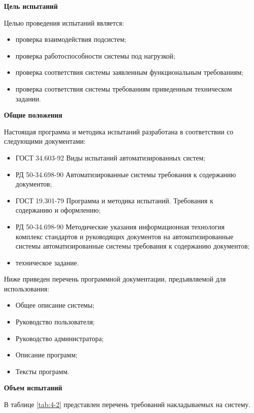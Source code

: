 \textbf{Цель испытаний}

Целью проведения испытаний является:
\begin{itemize}
  \item проверка взаимодействия подсистем;
  \item проверка работоспособности системы под
нагрузкой;
  \item проверка соответствия системы заявленным функциональным
требованиям;
  \item проверка соответствия системы требованиям приведенным техническом
задании.
\end{itemize}

\textbf{Общие положения}

Настоящая программа и методика испытаний разработана в соответствии со
следующими документами:
\begin{itemize}
  \item ГОСТ 34.603-92 Виды испытаний автоматизированных систем;
  \item РД 50-34.698-90
Автоматизированные системы требования к содержанию документов;
  \item ГОСТ 19.301-79
Программа и методика испытаний. Требования к содержанию и оформлению;
  \item РД 50-34.698-90 Методические указания информационная технология комплекс
  стандартов и руководящих документов на автоматизированные системы автоматизированные
системы требования к содержанию документов;
  \item техническое задание.
\end{itemize} 

Ниже приведен перечень программной документации, предъявляемой для
использования:
\begin{itemize}
  \item Общее описание системы;
  \item Руководство пользователя;
  \item Руководство
администратора;
  \item Описание программ;
  \item Тексты программ.
\end{itemize} 

\textbf{Объем испытаний} 

В таблице \ref{tab:4-2} представлен перечень требований накладываемых на систему.

